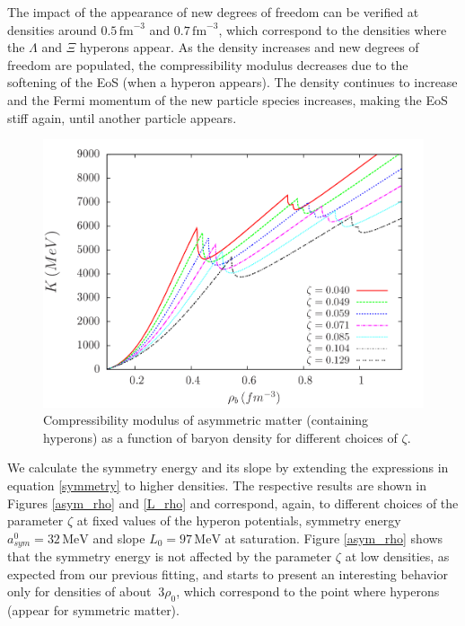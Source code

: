\documentclass[twocolumn,showpacs,aps]{revtex4}
\begin{document}
The impact of the appearance of new degrees of freedom can be verified at densities around
$0.5\, \mathrm{fm}^{-3}$ and $0.7\,\mathrm{fm}^{-3}$, which correspond to the densities where the $\Lambda$ and $\Xi$
hyperons appear.
As the density increases and new degrees of freedom are populated, the compressibility modulus
decreases due to the softening of the EoS (when a hyperon appears). 
The density continues to increase and the Fermi momentum of the new particle species increases,
making the EoS stiff again, until another particle appears. 
\begin{figure}
 \centering
 \vspace{1.0cm}
 \includegraphics[width=9.cm]{Krho_paper.png}
 \caption{\label{k_rho} Compressibility modulus of asymmetric matter (containing hyperons) as a function of baryon density for different choices of $\zeta$.}
 \end{figure}

 We calculate the symmetry energy and its slope by extending the expressions in equation \ref{symmetry} to higher densities.
 The respective results are shown in Figures \ref{asym_rho} and \ref{L_rho} and correspond, again, to different choices 
 of the parameter $\zeta$ at fixed values of the hyperon potentials, symmetry energy $a^0_{sym}=32\, \mathrm{MeV}$
  and slope $L_{0}=97\, \mathrm{MeV}$
  at saturation.
 Figure \ref{asym_rho} shows that the symmetry energy is not affected by the parameter $\zeta$ at low densities,
 as expected from our previous fitting, and starts to
 present an interesting behavior only for densities of about $~3 \rho_0$, which correspond to the point where hyperons (appear for symmetric matter).
 
\end{document}
